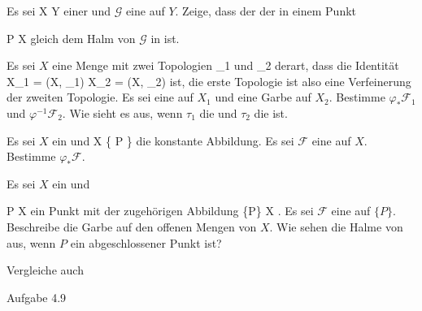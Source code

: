 {}
{





Es sei
\maabb {\varphi} { X } { Y
} {}
einer
und ${ \mathcal  G   }$ eine
auf $Y$. Zeige, dass der
der
in einem Punkt

\mavergleichskette
{\vergleichskette
{P
}
{ \in }{ X
}
{  }{
}
{    }{
}
{   }{
}
}
{}{}{}
gleich dem Halm von ${ \mathcal  G   }$ in
 ist.





}
{} {}

{}
{





Es sei $X$ eine Menge mit zwei Topologien
\mathkor {} {\tau_1} {und} {\tau_2} {}
derart, dass die Identität
\maabbdisp {\varphi} {X_1 = (X, \tau_1)} {X_2 =  (X, \tau_2)
} {}
ist, die erste Topologie ist also eine Verfeinerung der zweiten Topologie. Es sei
 eine
auf $X_1$ und
 eine Garbe auf $X_2$. Bestimme $\varphi_* { \mathcal  F   }_1$ und $\varphi^{-1} { \mathcal  F   }_2$. Wie sieht es aus, wenn $\tau_1$ die
und $\tau_2$ die
ist.





}
{} {}

{}
{





Es sei $X$ ein
und
\maabb {\varphi} { X } { \{ P \}
} {}
die konstante Abbildung. Es sei ${ \mathcal  F   }$ eine
auf $X$. Bestimme $\varphi_* { \mathcal  F   }$.





}
{} {}

{}
{





Es sei $X$ ein
und

\mavergleichskette
{\vergleichskette
{P
}
{ \in }{ X
}
{  }{
}
{    }{
}
{   }{
}
}
{}{}{}
ein Punkt mit der zugehörigen Abbildung
 {\{P\}} {X
} {.}
Es sei ${ \mathcal  F   }$ eine
auf $\{P\}$. Beschreibe die Garbe
 auf den offenen Mengen von $X$. Wie sehen die Halme von
 aus, wenn $P$ ein abgeschlossener Punkt ist?





}
{} {Vergleiche auch

Aufgabe 4.9
}

